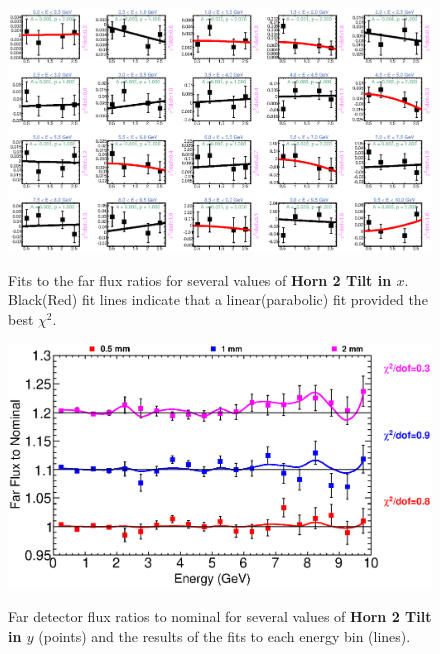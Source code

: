 \begin{figure}[ht]
  \begin{center}
    {\includegraphics[width=5.0in]{figures/Horn2XTilt_far_fits.eps}}
  \end{center}
\caption{ Fits to the far flux ratios for several values of {\bf Horn 2 Tilt in $x$}. Black(Red) fit lines indicate that a linear(parabolic) fit provided the best $\chi^2$. }
\end{figure}

\begin{figure}[ht]
  \begin{center}
    {\includegraphics[width=6.0in]{figures/Horn2YTilt_far_summary.eps}}
  \end{center}
\caption{ Far detector flux ratios to nominal for several values of {\bf Horn 2 Tilt in $y$} (points) and the results of the fits to each energy bin (lines).}
\end{figure}

